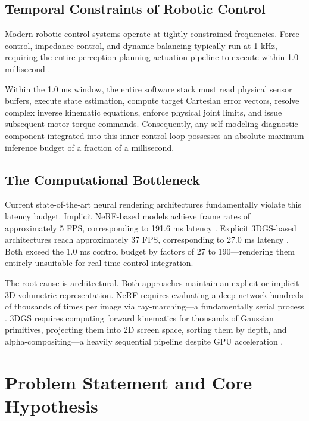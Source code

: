 \documentclass[12pt,a4paper,oneside]{report}
\begin{document}
\subsection{Temporal Constraints of Robotic Control}
\label{subsec:temporal_constraints}

Modern robotic control systems operate at tightly constrained frequencies. Force control, impedance control, and dynamic balancing typically run at 1 kHz, requiring the entire perception-planning-actuation pipeline to execute within 1.0 millisecond \cite{siciliano2009robotics}.

Within the 1.0 ms window, the entire software stack must read physical sensor buffers, execute state estimation, compute target Cartesian error vectors, resolve complex inverse kinematic equations, enforce physical joint limits, and issue subsequent motor torque commands. Consequently, any self-modeling diagnostic component integrated into this inner control loop possesses an absolute maximum inference budget of a fraction of a millisecond.

\subsection{The Computational Bottleneck}
\label{subsec:computational_bottleneck}

Current state-of-the-art neural rendering architectures fundamentally violate this latency budget. Implicit NeRF-based models achieve frame rates of approximately 5 FPS, corresponding to 191.6 ms latency \cite{hu2024teaching}. Explicit 3DGS-based architectures reach approximately 37 FPS, corresponding to 27.0 ms latency \cite{hu2025learning}. Both exceed the 1.0 ms control budget by factors of 27 to 190---rendering them entirely unsuitable for real-time control integration.

The root cause is architectural. Both approaches maintain an explicit or implicit 3D volumetric representation. NeRF requires evaluating a deep network hundreds of thousands of times per image via ray-marching---a fundamentally serial process \cite{mildenhall2020nerf}. 3DGS requires computing forward kinematics for thousands of Gaussian primitives, projecting them into 2D screen space, sorting them by depth, and alpha-compositing---a heavily sequential pipeline despite GPU acceleration \cite{kerbl20233d}.

\section{Problem Statement and Core Hypothesis}
\label{sec:problem_hypothesis_intro}
\end{document}
